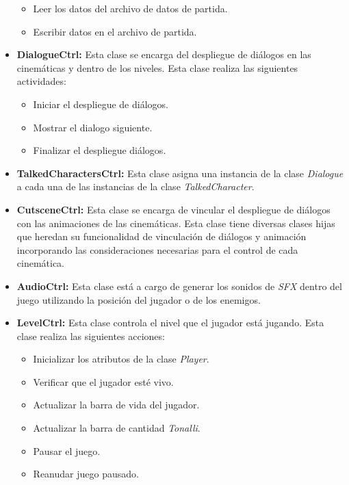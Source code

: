 \begin{itemize}
\begin{itemize}
				\item Leer los datos del archivo de datos de partida.
				\item Escribir datos en el archivo de partida.
			\end{itemize}
			\item \textbf{DialogueCtrl:} Esta clase se encarga del despliegue de diálogos
			en las cinemáticas y dentro de los niveles. Esta clase realiza las siguientes 
			actividades:
			\begin{itemize}
				\item Iniciar el despliegue de diálogos.
				\item Mostrar el dialogo siguiente.
				\item Finalizar el despliegue diálogos. 
			\end{itemize}	
			\item \textbf{TalkedCharactersCtrl:} Esta clase asigna una instancia de la 
			clase \textit{Dialogue} a cada una de las instancias de la clase 
			\textit{TalkedCharacter}.
			\item \textbf{CutsceneCtrl:} Esta clase se encarga de vincular el despliegue 
			de diálogos con las animaciones de las cinemáticas. Esta clase tiene diversas 
			clases hijas que heredan su funcionalidad de vinculación de diálogos y animación 
			incorporando las consideraciones necesarias para el control de cada cinemática.
			\item \textbf{AudioCtrl:} Esta clase está a cargo de generar los sonidos de \textit{SFX} 
			dentro del juego utilizando la posición del jugador o de los enemigos. 
			\item \textbf{LevelCtrl:} Esta clase controla el nivel que el jugador está 
			jugando. Esta clase realiza las siguientes acciones:
			\begin{itemize}
				\item Inicializar los atributos de la clase \textit{Player}.
				\item Verificar que el jugador esté vivo.
				\item Actualizar la barra de vida del jugador.
				\item Actualizar la barra de cantidad \textit{Tonalli}.
				\item Pausar el juego.
				\item Reanudar juego pausado. 

\end{itemize}
\end{itemize}
